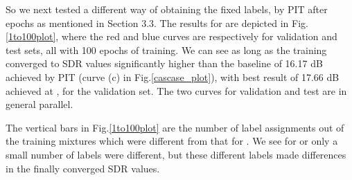 \documentclass{article}
\begin{document}
So we next tested a different way of obtaining the fixed labels, by PIT after  epochs as mentioned in Section 3.3. The results for  are depicted in Fig.\ref{1to100plot}, where the red and blue curves are respectively for validation and test sets, all with 100 epochs of training. We can see as long as  the training converged to SDR values significantly higher than the baseline of 16.17 dB achieved by PIT (curve (c) in Fig.\ref{cascase_plot}), with best result of 17.66 dB achieved at , for the validation set. The two curves for validation and test are in general parallel.

The vertical bars in Fig.\ref{1to100plot} are the number of label assignments out of the  training mixtures which were different from that for . We see for  or  only a small number of labels were different, but these different labels made differences in the finally converged SDR values.
\end{document}
